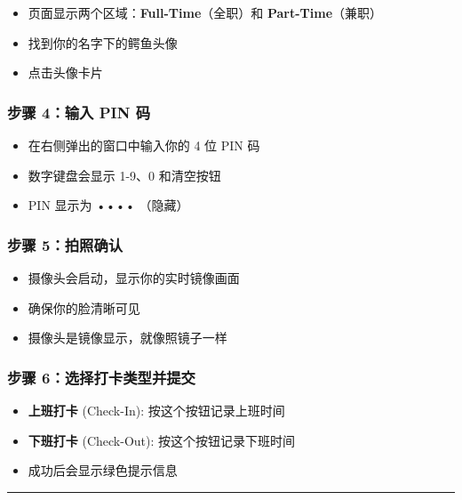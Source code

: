 \documentclass[
]{article}
\providecommand{\tightlist}{%
  \setlength{\itemsep}{0pt}\setlength{\parskip}{0pt}}
\begin{document}
\begin{itemize}
\tightlist
\item
  页面显示两个区域：\textbf{Full-Time}（全职）和
  \textbf{Part-Time}（兼职）
\item
  找到你的名字下的鳄鱼头像
\item
  点击头像卡片
\end{itemize}

\subsubsection{步骤 4：输入 PIN
码}\label{ux6b65ux9aa4-4ux8f93ux5165-pin-ux7801}

\begin{itemize}
\tightlist
\item
  在右侧弹出的窗口中输入你的 4 位 PIN 码
\item
  数字键盘会显示 1-9、0 和清空按钮
\item
  PIN 显示为 •••• （隐藏）
\end{itemize}

\subsubsection{步骤
5：拍照确认}\label{ux6b65ux9aa4-5ux62cdux7167ux786eux8ba4}

\begin{itemize}
\tightlist
\item
  摄像头会启动，显示你的实时镜像画面
\item
  确保你的脸清晰可见
\item
  摄像头是镜像显示，就像照镜子一样
\end{itemize}

\subsubsection{步骤
6：选择打卡类型并提交}\label{ux6b65ux9aa4-6ux9009ux62e9ux6253ux5361ux7c7bux578bux5e76ux63d0ux4ea4}

\begin{itemize}
\tightlist
\item
  \textbf{上班打卡} (Check-In): 按这个按钮记录上班时间
\item
  \textbf{下班打卡} (Check-Out): 按这个按钮记录下班时间
\item
  成功后会显示绿色提示信息
\end{itemize}

\begin{center}\rule{0.5\linewidth}{0.5pt}\end{center}
\end{document}
